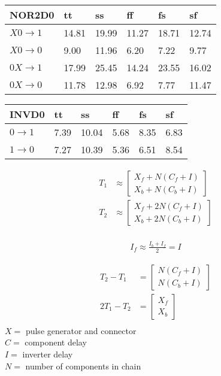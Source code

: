 \documentclass{article}
\begin{document}
\begin{table}
\begin{tabular}{|l|lllll|} \hline
NOR2D0   & tt    & ss    & ff    & fs    & sf    \\ \hline
$X0\to1$ & 14.81 & 19.99 & 11.27 & 18.71 & 12.74 \\
$X0\to0$ &  9.00 & 11.96 &  6.20 &  7.22 &  9.77 \\
$0X\to1$ & 17.99 & 25.45 & 14.24 & 23.55 & 16.02 \\
$0X\to0$ & 11.78 & 12.98 &  6.92 &  7.77 & 11.47 \\ \hline
\end{tabular}
\end{table}

\begin{tabular}{|l|lllll|} \hline
INVD0   & tt    & ss    & ff    & fs    & sf    \\ \hline
$0\to1$ &  7.39 & 10.04 &  5.68 &  8.35 &  6.83 \\
$1\to0$ &  7.27 & 10.39 &  5.36 &  6.51 &  8.54 \\ \hline
\end{tabular}


\begin{align*}
T_1 &\approx \begin{bmatrix}
X_f+N(C_f+I)\\
X_b+N(C_b+I)\end{bmatrix}\\
T_2 &\approx \begin{bmatrix}
X_f+2N(C_f+I)\\
X_b+2N(C_b+I)\end{bmatrix}\\
\end{align*}

\begin{align*}
I_f \approx \frac{I_b+I_f}{2} = I
\end{align*}

\begin{align*}
T_2-T_1 &= 
\begin{bmatrix}
N(C_f+I)\\
N(C_b+I)
\end{bmatrix}\\
2T_1-T_2 &= 
\begin{bmatrix}
X_f\\
X_b
\end{bmatrix}\\
\end{align*}
$X =$ pulse generator and connector\\
$C =$ component delay\\
$I =$ inverter delay\\
$N =$ number of components in chain
\end{document}
